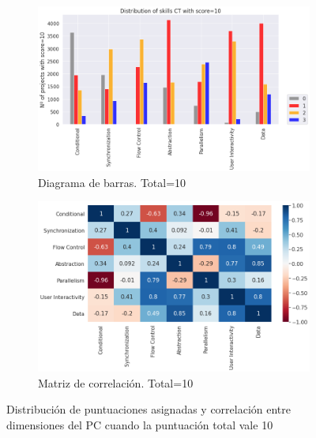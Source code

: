 \documentclass[a4paper, 12pt]{book}
\begin{document}
\begin{figure}[H]
    \centering
    \begin{subfigure}[h]{.49\textwidth} 
        \includegraphics[width=\textwidth]{img/distribucion_10_Snap}
        \caption{Diagrama de barras. Total=10}
        \label{fig:total10_Snap}
    \end{subfigure}       
    \begin{subfigure}[h]{.49\textwidth} 
        \includegraphics[width=\textwidth]{img/corr_10_Snap}
        \caption{Matriz de correlación. Total=10}
        \label{fig:corr10_Snap}
    \end{subfigure}
    \caption{Distribución de puntuaciones asignadas y correlación entre dimensiones del PC cuando la puntuación total vale 10}
\end{figure}
\end{document}
